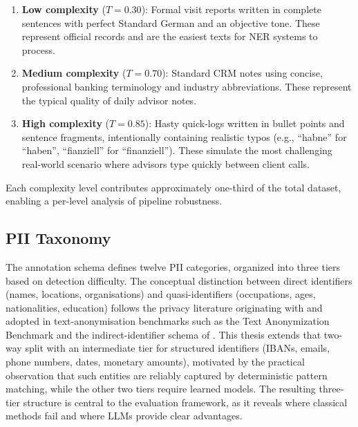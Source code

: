\begin{enumerate}
    \item \textbf{Low complexity} ($T = 0.30$): Formal visit reports written in
    complete sentences with perfect Standard German and an objective tone.
    These represent official records and are the easiest texts for NER systems
    to process.

    \item \textbf{Medium complexity} ($T = 0.70$): Standard CRM notes using
    concise, professional banking terminology and industry abbreviations.
    These represent the typical quality of daily advisor notes.

    \item \textbf{High complexity} ($T = 0.85$): Hasty quick-logs written in
    bullet points and sentence fragments, intentionally containing realistic
    typos (e.g., ``habne'' for ``haben'', ``fianziell'' for ``finanziell'').
    These simulate the most challenging real-world scenario where advisors
    type quickly between client calls.
\end{enumerate}

Each complexity level contributes approximately one-third of the total dataset,
enabling a per-level analysis of pipeline robustness.


\subsection{PII Taxonomy}
\label{sec:pii_taxonomy}

The annotation schema defines twelve PII categories, organized into three
tiers based on detection difficulty. The conceptual distinction between
direct identifiers (names, locations, organisations) and quasi-identifiers
(occupations, ages, nationalities, education) follows the privacy
literature originating with \citet{sweeney2002kanonymity} and adopted in
text-anonymisation benchmarks such as the Text Anonymization Benchmark
\citep{pilan2022tab} and the indirect-identifier schema of
\citet{baroud2025indirect}. This thesis extends that two-way split with
an intermediate tier for structured identifiers (IBANs, emails, phone
numbers, dates, monetary amounts), motivated by the practical observation
that such entities are reliably captured by deterministic pattern
matching, while the other two tiers require learned models. The resulting
three-tier structure is central to the evaluation framework, as it
reveals where classical methods fail and where LLMs provide clear
advantages.


